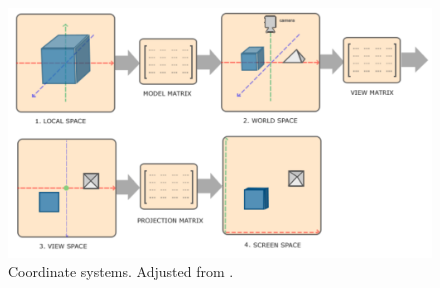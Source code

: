 \begin{figure}[h!]
    \centering
    \includegraphics[width=0.85\linewidth]{images/coordinateSystemsAdjusted}
    \caption{Coordinate systems. Adjusted from \cite{de_vries_learn_2020}.}
    \label{fig:coordinate-systems}
\end{figure}

